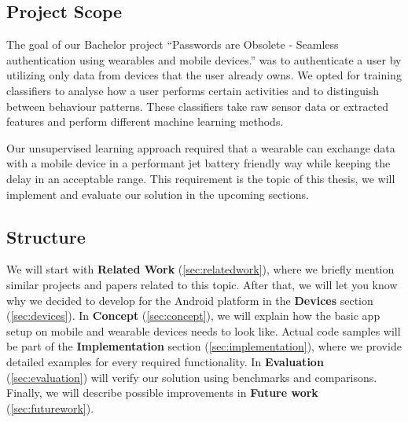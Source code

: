 \subsection{Project Scope}
\label{sec:intro:scope}
The goal of our Bachelor project ``Passwords are Obsolete - Seamless authentication using wearables and mobile devices.'' was to authenticate a user by utilizing only data from devices that the user already owns.
We opted for training classifiers to analyse how a user performs certain activities and to distinguish between behaviour patterns. These classifiers take raw sensor data or extracted features and perform different machine learning methods.

Our unsupervised learning approach required that a wearable can exchange data with a mobile device in a performant jet battery friendly way while keeping the delay in an acceptable range.
This requirement is the topic of this thesis, we will implement and evaluate our solution in the upcoming sections.

\subsection{Structure}
\label{sec:intro:structure}

We will start with \textbf{Related Work} (\ref{sec:relatedwork}), where we briefly mention similar projects and papers related to this topic.
After that, we will let you know why we decided to develop for the Android platform in the \textbf{Devices} section (\ref{sec:devices}).
In \textbf{Concept} (\ref{sec:concept}), we will explain how the basic app setup on mobile and wearable devices needs to look like.
Actual code samples will be part of the \textbf{Implementation} section (\ref{sec:implementation}), where we provide detailed examples for every required functionality.
In \textbf{Evaluation} (\ref{sec:evaluation}) will verify our solution using benchmarks and comparisons.
Finally, we will describe possible improvements in \textbf{Future work} (\ref{sec:futurework}).

\clearpage